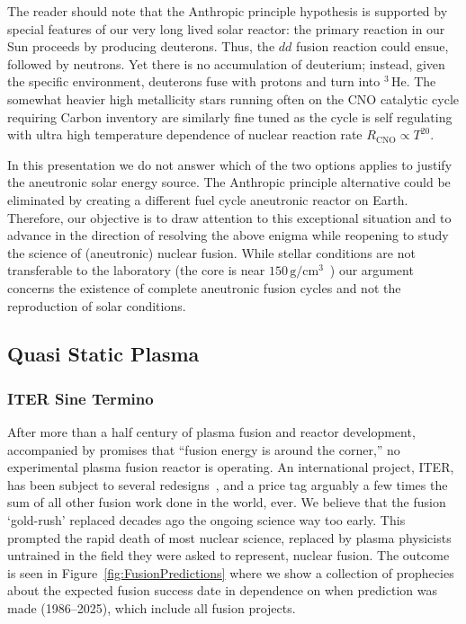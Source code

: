 \documentclass[particles,article,accept,pdftex,moreauthors]{Definitions/mdpi}
\newcommand{\rf}[1]{Figure~\ref{#1}}
\begin{document}
The reader should note that the Anthropic principle hypothesis is supported by special features of our very long lived solar reactor: the primary reaction in our Sun proceeds by producing deuterons. Thus, the $dd$ fusion reaction could ensue, followed by neutrons. Yet there is no accumulation of deuterium; instead, given the specific environment, deuterons fuse with protons and turn into ${}^3\,\mathrm{He}$. The somewhat heavier high metallicity stars running often on the CNO catalytic cycle requiring Carbon inventory are similarly fine tuned as the cycle is self regulating with ultra high temperature dependence of nuclear reaction rate $R_\mathrm{CNO}\propto T^{20}$.

In this presentation we do not answer which of the two options applies to justify the aneutronic solar energy source. The Anthropic principle alternative could be eliminated by creating a different fuel cycle aneutronic reactor on Earth. Therefore, our objective is to draw attention to this exceptional situation and to advance in the direction of resolving the above enigma while reopening to study the science of (aneutronic) nuclear fusion. While stellar conditions are not transferable to the laboratory (the core is near $150\,\mathrm{g/cm^3}$~\cite{Bahcall:2000nu}) our argument concerns the existence of complete aneutronic fusion cycles and not the reproduction of solar conditions.


\subsection{Quasi Static Plasma}\label{ssec:plasmaF}
\subsubsection{ITER Sine Termino}\label{sssec:INTiter}
After more than a half century of plasma fusion and reactor development, accompanied by promises that ``fusion energy is around the corner,'' no experimental plasma fusion reactor is operating. An international project, ITER, has been subject to several redesigns~\cite{Aymer:2001,ITR-18-003,ITR-24-005,loarte2025new}, and a price tag arguably a few times the sum of all other fusion work done in the world, ever. We believe that the fusion `gold-rush' replaced decades ago the ongoing science way too early. This prompted the rapid death of most nuclear science, replaced by plasma physicists untrained in the field they were asked to represent, nuclear fusion. The outcome is seen in \rf{fig:FusionPredictions} where we show a collection of prophecies about the expected fusion success date in dependence on when prediction was made (1986--2025), which include all fusion projects.
\end{document}
